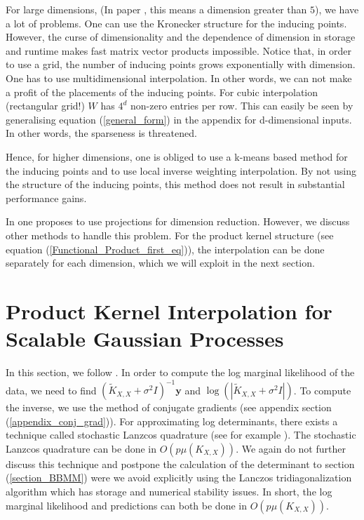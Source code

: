 \documentclass[12pt,a4paper,oneside]{book}
\begin{document}
For large dimensions, (In paper \cite{wilson2015kernel}, this means a dimension greater than $5$), we have a lot of problems. One can use the Kronecker structure for the inducing points. However, the curse of dimensionality and the dependence of dimension in storage and runtime  makes fast matrix vector products impossible. Notice that, in order to use a grid, the number of inducing points grows exponentially with dimension. One has to use multidimensional interpolation. In other words, we can not make a profit of the placements of the inducing points. For cubic interpolation (rectangular grid!) $W$ has $4^d$ non-zero entries per row. This can easily be seen by generalising equation (\ref{general_form}) in the appendix for d-dimensional inputs. In other words, the sparseness is threatened. 


Hence, for higher dimensions, one is obliged to use a k-means based method for the inducing points and to use local inverse weighting interpolation. By not using the structure of the inducing points, this method does not result in substantial performance gains.


In \cite{wilson2015thoughts} one proposes to use projections for dimension reduction. However, we discuss other methods to handle this problem. For the product kernel structure (see equation (\ref{Functional_Product_first_eq})), the interpolation can be done separately for each dimension, which we will exploit in the next section.

\section{Product Kernel Interpolation for Scalable Gaussian Processes}

In this section, we follow \cite{gardner2018product}. In order to compute the log marginal likelihood of the data, we need to find $(\tilde{K}_{X,X} + \sigma^2 I)^{-1} \bm{y}$ and $\log( |\tilde{K}_{X,X} + \sigma^2 I|)$. To compute the inverse, we use the method of conjugate gradients (see appendix section (\ref{appendix_conj_grad})).
For approximating log determinants, there exists a technique called stochastic Lanzcos quadrature (see for example \cite{ubaru2017fast}).  The stochastic Lanzcos quadrature can be done in $O(p \mu(K_{X,X}))$. We again do not further discuss this technique and postpone the calculation of the determinant to section (\ref{section_BBMM}) were we avoid explicitly using the Lanczos tridiagonalization algorithm which has storage and numerical stability issues. In short, the log marginal likelihood and predictions can both be done in $O(p \mu(K_{X,X}))$. 
\end{document}
